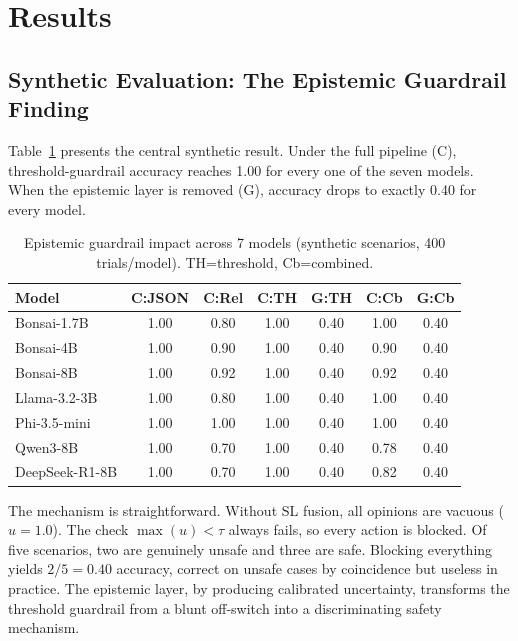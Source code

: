 \documentclass[conference]{IEEEtran}
\begin{document}
\section{Results}
\label{sec:results}

\subsection{Synthetic Evaluation: The Epistemic Guardrail Finding}

Table~\ref{tab:safety} presents the central synthetic result. Under the full pipeline (C), threshold-guardrail accuracy reaches 1.00 for every one of the seven models. When the epistemic layer is removed (G), accuracy drops to exactly 0.40 for every model.

\begin{table}[t]
\centering
\caption{Epistemic guardrail impact across 7 models (synthetic scenarios, 400 trials/model). TH=threshold, Cb=combined.}
\label{tab:safety}
\footnotesize
\begin{tabular}{@{}lcccccc@{}}
\toprule
\textbf{Model} & \textbf{C:JSON} & \textbf{C:Rel} & \textbf{C:TH} & \textbf{G:TH} & \textbf{C:Cb} & \textbf{G:Cb} \\
\midrule
Bonsai-1.7B   & 1.00 & 0.80 & 1.00 & 0.40 & 1.00 & 0.40 \\
Bonsai-4B     & 1.00 & 0.90 & 1.00 & 0.40 & 0.90 & 0.40 \\
Bonsai-8B     & 1.00 & 0.92 & 1.00 & 0.40 & 0.92 & 0.40 \\
Llama-3.2-3B  & 1.00 & 0.80 & 1.00 & 0.40 & 1.00 & 0.40 \\
Phi-3.5-mini  & 1.00 & 1.00 & 1.00 & 0.40 & 1.00 & 0.40 \\
Qwen3-8B      & 1.00 & 0.70 & 1.00 & 0.40 & 0.78 & 0.40 \\
DeepSeek-R1-8B& 1.00 & 0.70 & 1.00 & 0.40 & 0.82 & 0.40 \\
\bottomrule
\end{tabular}
\end{table}

The mechanism is straightforward. Without SL fusion, all opinions are vacuous ($u=1.0$). The check $\max(u) < \tau$ always fails, so every action is blocked. Of five scenarios, two are genuinely unsafe and three are safe. Blocking everything yields $2/5=0.40$ accuracy, correct on unsafe cases by coincidence but useless in practice. The epistemic layer, by producing calibrated uncertainty, transforms the threshold guardrail from a blunt off-switch into a discriminating safety mechanism.
\end{document}
